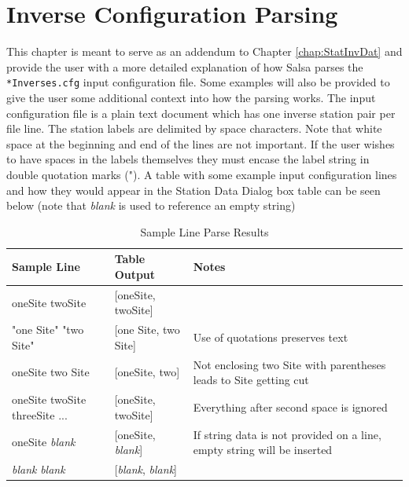 \chapter{Inverse Configuration Parsing}
\label{chap:invConPar}

This chapter is meant to serve as an addendum to Chapter \ref{chap:StatInvDat} and provide the user with a more detailed explanation of how Salsa parses the \verb+*Inverses.cfg+ input configuration file. Some examples will also be provided to give the user some additional context into how the parsing works. The input configuration file is a plain text document which has one inverse station pair per file line. The station labels are delimited by space characters. Note that white space at the beginning and end of the lines are not important. If the user wishes to have spaces in the labels themselves they must encase the label string in double quotation marks ("). A table with some example input configuration lines and how they would appear in the Station Data Dialog box table can be seen below (note that \emph{blank} is used to reference an empty string)

\begin{table}[htb]
\caption{Sample Line Parse Results}
\label{tab:conParEx}
\begin{center}
\begin{tabular}{llp{2.5 in}}
\hline
\textbf{Sample Line} & \textbf{Table Output} & \textbf{Notes} \\
\hline
oneSite twoSite & [oneSite, twoSite] & \\
"one Site" "two Site" & [one Site, two Site] & Use of quotations preserves text \\
oneSite two Site & [oneSite, two] & Not enclosing two Site with parentheses leads to Site getting cut \\
oneSite twoSite threeSite ... & [oneSite, twoSite] & Everything after second space is ignored \\
oneSite \emph{blank} & [oneSite, \emph{blank}] & If string data is not provided on a line, empty string will be inserted \\
\emph{blank} \emph{blank} & [\emph{blank}, \emph{blank}] & \\
\hline
\end{tabular}
\end{center}
\end{table}
